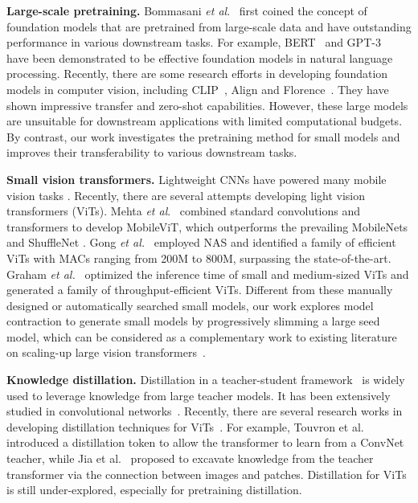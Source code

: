 \documentclass[runningheads]{llncs}
\begin{document}
\textbf{Large-scale pretraining.} Bommasani \emph{et al}.~\cite{foundation} first coined the concept of foundation models that are pretrained from large-scale data and have outstanding performance in various downstream tasks. 
For example, BERT~\cite{bert} and GPT-3~\cite{gpt} have been demonstrated to be effective foundation models in natural language processing.
Recently, there are some research efforts in developing foundation models in computer vision, including CLIP~\cite{clip}, Align \cite{align} and Florence~\cite{florence}.
They have shown impressive transfer and zero-shot capabilities. However, these large models are unsuitable for downstream applications with limited computational budgets.
By contrast, our work investigates the pretraining method for small models and improves their transferability to various downstream tasks.

\textbf{Small vision transformers.} 
Lightweight CNNs have powered many mobile vision tasks \cite{mobilenetv3,efficientnet}. 
Recently, there are several attempts developing light vision transformers (ViTs).
Mehta \emph{et al}.~\cite{mobilevit} combined standard convolutions and transformers to develop MobileViT, which outperforms the prevailing MobileNets \cite{mobilenetv3} and ShuffleNet \cite{shufflenet}.  
Gong \emph{et al.}~\cite{nasvit} employed NAS and identified a family of efficient ViTs with MACs ranging from 200M to 800M, surpassing the state-of-the-art. Graham \emph{et al.}~\cite{levit} optimized the inference time of small and medium-sized ViTs and generated a family of throughput-efficient ViTs. 
Different from these manually designed or automatically searched small models, our work explores model contraction to generate small models by progressively slimming a large seed model, which can be considered as a complementary work to existing literature on scaling-up large vision transformers~\cite{autoscaling,scalevit,vmoe,swin_v2}.


\textbf{Knowledge distillation.} 
Distillation in a teacher-student framework~\cite{distill_hinton} is widely used to 
leverage knowledge from large teacher models.
It has been extensively studied in convolutional networks~\cite{gou2021knowledge}.
Recently, there are several research works in developing distillation techniques for ViTs~\cite{uvc,meta}.
For example, Touvron et al.~\cite{deit} introduced a distillation token to allow the transformer to learn from a ConvNet teacher, while Jia et al.~\cite{jia2021efficient} proposed to excavate knowledge from the teacher transformer via the connection between images and patches. Distillation for ViTs is still under-explored, especially for pretraining distillation. 
\end{document}
